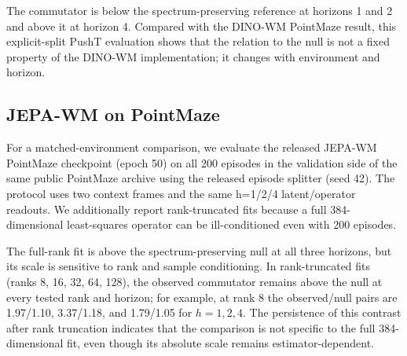 \documentclass{article}
\begin{document}
The commutator is below the spectrum-preserving reference at horizons 1 and 2
and above it at horizon 4. Compared with the DINO-WM PointMaze result, this
explicit-split PushT evaluation shows that the relation to the null is not a
fixed property of the DINO-WM implementation; it changes with environment and
horizon.

\subsection{JEPA-WM on PointMaze}
\label{sec:supp-jepa-wm-pointmaze}

For a matched-environment comparison, we evaluate the released JEPA-WM
PointMaze checkpoint (epoch 50) on all 200 episodes in the validation side of
the same public PointMaze archive using the released episode splitter (seed
42). The protocol uses two context frames and the same h=1/2/4 latent/operator
readouts. We additionally report rank-truncated fits because a full 384-dimensional
least-squares operator can be ill-conditioned even with 200 episodes.

\begin{table}[H]
\centering
\small
\setlength{\tabcolsep}{3pt}
\caption{JEPA-WM on PointMaze. The checkpoint is evaluated on all
200 code-reconstructed validation episodes with the same readouts used for
DINO-WM.}
\label{tab:supp-jepa-wm-pointmaze}
\end{table}

The full-rank fit is above the spectrum-preserving null at all three horizons,
but its scale is sensitive to rank and sample conditioning. In rank-truncated
fits (ranks 8, 16, 32, 64, 128), the observed commutator remains above the null
at every tested rank and horizon; for example, at rank 8 the observed/null
pairs are 1.97/1.10, 3.37/1.18, and 1.79/1.05 for $h=1,2,4$. The persistence of
this contrast after rank truncation indicates that the comparison is not
specific to the full 384-dimensional fit, even though its absolute scale
remains estimator-dependent.
\end{document}
